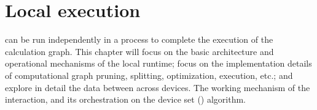 \begin{savequote}[45mm]
\end{savequote}


\chapter{Local execution} 
\label{ch:local}
\begin{content}
\tf{} can be run independently in a process to complete the execution of the calculation graph. This chapter will focus on the basic architecture and operational mechanisms of the local runtime; focus on the implementation details of computational graph pruning, splitting, optimization, execution, etc.; and explore in detail the data between  across devices. The working mechanism of the interaction, and its  orchestration on the device set () algorithm.
\end{content}


